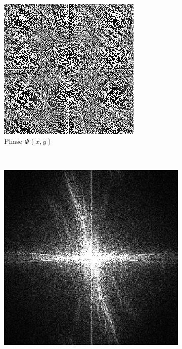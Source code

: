 \documentclass{report}
\begin{document}
\begin{figure}[H]
\begin{subfigure}[b]{0.2\textwidth}
                \includegraphics[width=\textwidth]{graphics/phase.png}
                \caption{Phase $\Phi(x,y)$}
                \label{fig:mouse}
        \end{subfigure}
        ~
        \begin{subfigure}[b]{0.2\textwidth}
                \includegraphics[width=\textwidth]{graphics/ampl.png}

\end{subfigure}
\end{figure}
\end{document}
